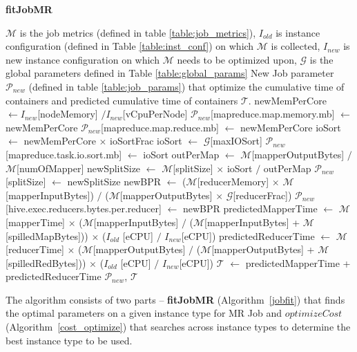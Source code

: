 \begin{algorithm}
	\caption{\textbf{fitJobMR}}\label{jobfit}
	\begin{algorithmic}[1]
		\footnotesize
		\REQUIRE  $\mathcal{M}$ is the job metrics (defined in table \ref{table:job_metrics}), $I_{old}$  is instance configuration (defined in Table \ref{table:inst_conf}) on which $\mathcal{M}$ is collected, $I_{new}$ is new instance configuration on which $\mathcal{M}$ needs to be optimized upon, $\mathcal{G}$ is the global parameters defined in Table \ref{table:global_params}
		\ENSURE New Job parameter $\mathcal{P}_{new}$ (defined in table \ref{table:job_params}) that optimize the cumulative time of containers and predicted cumulative time of containers $\mathcal{T}$.
		\STATE newMemPerCore $\gets I_{new}$[nodeMemory] $/ I_{new}$[vCpuPerNode]
		\STATE $\mathcal{P}_{new}$[mapreduce.map.memory.mb] $\gets$ newMemPerCore
		\STATE $\mathcal{P}_{new}$[mapreduce.map.reduce.mb] $\gets$ newMemPerCore
		\STATE ioSort $\gets$ newMemPerCore $\times$ ioSortFrac
		\STATE ioSort $\gets$ $\mathcal{G}$[maxIOSort]
		\ENDIF
		\STATE $\mathcal{P}_{new}$[mapreduce.task.io.sort.mb] $\gets$ ioSort
		\STATE outPerMap $\gets$ $\mathcal{M}$[mapperOutputBytes] $/$ $\mathcal{M}$[numOfMapper]
		\STATE newSplitSize $\gets$ $\mathcal{M}$[splitSize] $\times$ ioSort $/$ outPerMap
		\STATE $\mathcal{P}_{new}$[splitSize] $\gets$ newSplitSize
		\STATE newBPR $\gets$ ($\mathcal{M}$[reducerMemory] $\times$ $\mathcal{M}$[mapperInputBytes]) $/$ ($\mathcal{M}$[mapperOutputBytes] $\times$ $\mathcal{G}$[reducerFrac])  
		\STATE $\mathcal{P}_{new}$[hive.exec.reducers.bytes.per.reducer] $\gets$ newBPR
		\STATE predictedMapperTime $\gets$ $\mathcal{M}$[mapperTime] $\times$ ($\mathcal{M}$[mapperInputBytes] $/$ ($\mathcal{M}$[mapperInputBytes] + $\mathcal{M}$[spilledMapBytes])) $\times$ ($I_{old}$ [eCPU] $/$ $I_{new}$[eCPU])
		\STATE predictedReducerTime $\gets$ $\mathcal{M}$[reducerTime] $\times$ ($\mathcal{M}$[mapperOutputBytes] $/$ ($\mathcal{M}$[mapperOutputBytes] + $\mathcal{M}$[spilledRedBytes])) $\times$ ($I_{old}$ [eCPU] $/$ $I_{new}$[eCPU])
		\STATE $\mathcal{T}$ $\gets$ predictedMapperTime + predictedReducerTime
		\STATE \RETURN $\mathcal{P}_{new}$, $\mathcal{T}$
	\end{algorithmic}
\end{algorithm}

The algorithm consists of two parts -- \textbf{fitJobMR} (Algorithm~\ref{jobfit}) that finds the optimal parameters on a given instance type for MR Job and $optimizeCost$ (Algorithm~\ref{cost_optimize}) that searches across instance types to determine the best instance type to be used. 

